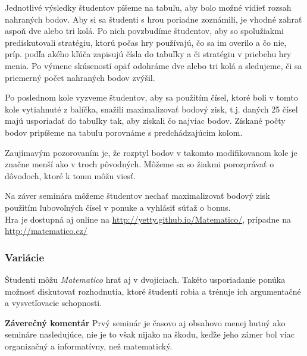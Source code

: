 Jednotlivé výsledky študentov píšeme na tabuľu, aby bolo možné vidieť rozsah nahraných bodov. Aby si sa študenti s hrou poriadne zoznámili, je vhodné zahrať aspoň dve alebo tri kolá. Po nich povzbudíme študentov, aby so spolužiakmi prediskutovali stratégiu, ktorú počas hry používajú, čo sa im overilo a čo nie, príp. podľa akého kľúča zapisujú čísla do tabuľky a či stratégiu v priebehu hry menia. Po výmene skúseností opäť odohráme dve alebo tri kolá a sledujeme, či sa priemerný počet nahraných bodov zvýšil.

Po poslednom kole vyzveme študentov, aby sa použitím čísel, ktoré boli v tomto kole vytiahnuté z balíčka, snažili maximalizovať bodový zisk, t.j. daných 25 čísel majú usporiadať do tabuľky tak, aby získali čo najviac bodov. Získané počty bodov pripíšeme na tabuľu porovnáme s predchádzajúcim kolom.

Zaujímavým pozorovaním je, že rozptyl bodov v takomto modifikovanom kole je značne menší ako v troch pôvodných. Môžeme sa so žiakmi porozprávať o dôvodoch, ktoré k tomu môžu viesť.

Na záver seminára môžeme študentov nechať maximalizovať bodový zisk použitím ľubovoľných čísel v ponuke a vyhlásiť súťaž o bonus. \\

Hra je dostupná aj online na \url{http://yetty.github.io/Matematico/}, prípadne na \url{http://matematico.cz/}

\subsubsection*{Variácie}

Študenti môžu \textit{Matematico} hrať aj v dvojiciach. Takéto usporiadanie ponúka možnosť diskutovať rozhodnutia, ktoré študenti robia a trénuje ich argumentačné a vysvetľovacie schopnosti.

\textbf{Záverečný komentár}
Prvý seminár je časovo aj obsahovo menej hutný ako semináre nasledujúce, nie je to však nijako na škodu, keďže jeho zámer bol viac organizačný a informatívny, než matematický.
